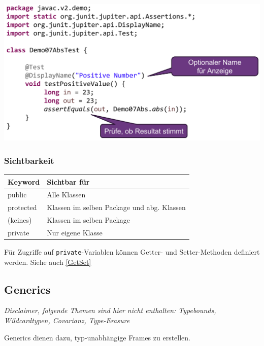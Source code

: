 \begin{center}
    \includegraphics[width=0.8\columnwidth]{pictures/testmethode.png}    
\end{center}

\subsubsection{Sichtbarkeit}
\begin{center}
    \begin{tabular}{ll}
        \rowcolor[RGB]{239,239,239} 
        \textbf{Keyword} & \textbf{Sichtbar für} \\ \hline
        public & Alle Klassen \\
        protected & Klassen im selben Package und abg. Klassen\\
        (keines) & Klassen im selben Package \\
        private & Nur eigene Klasse \\
    \end{tabular}
\end{center}

Für Zugriffe auf \verb|private|-Variablen können Getter- und Setter-Methoden definiert werden. Siehe auch \ref{GetSet}


\subsection{Generics}

\textit{Disclaimer, folgende Themen sind hier nicht enthalten: Typebounds, Wildcardtypen, Covarianz, Type-Erasure}

Generics dienen dazu, typ-unabhängige Frames zu erstellen. 

